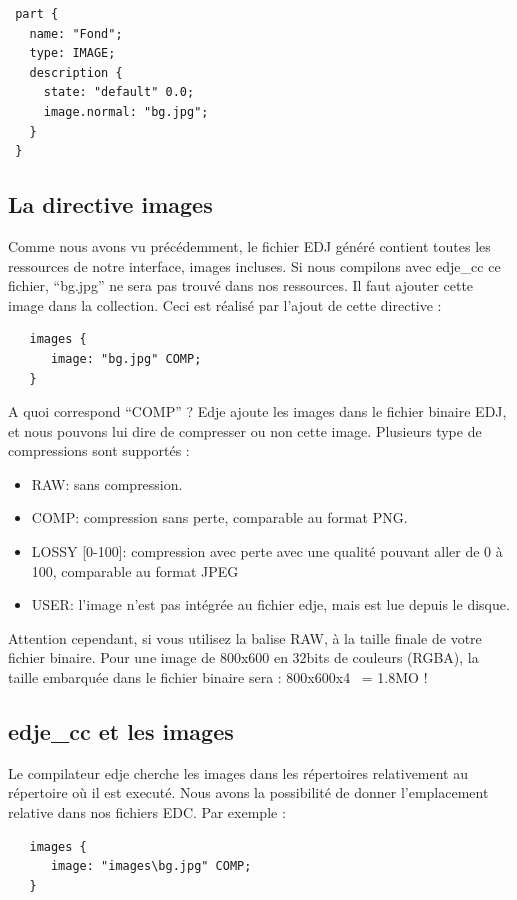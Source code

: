 \documentclass[a4paper]{efr}
\begin{document}
\begin{lstlisting}
 part {
   name: "Fond";
   type: IMAGE;
   description {
     state: "default" 0.0;
     image.normal: "bg.jpg";
   }
 }
\end{lstlisting}
\subsection{La directive images}
Comme nous avons vu précédemment, le fichier EDJ généré contient toutes les
ressources de notre interface, images incluses. Si nous compilons avec edje\_cc
ce fichier, ``bg.jpg'' ne sera pas trouvé dans nos ressources. Il faut ajouter
cette image dans la collection. Ceci est réalisé par l'ajout de cette directive
:
\begin{lstlisting}
   images {
      image: "bg.jpg" COMP;
   }
\end{lstlisting}

A quoi correspond ``COMP'' ? Edje ajoute les images dans le fichier binaire EDJ,
et nous pouvons lui dire de compresser ou non cette image.
Plusieurs type de compressions sont supportés :
\begin{itemize}
\item RAW: sans compression.
\item COMP: compression sans perte, comparable au format PNG.
\item LOSSY [0-100]: compression avec perte avec une qualité pouvant aller
de 0 à 100, comparable au format JPEG
\item USER: l'image n'est pas intégrée au fichier edje, mais est lue depuis
le disque.
\end{itemize}

Attention cependant, si vous utilisez la balise RAW, à la taille
finale de votre fichier binaire.
Pour une image de 800x600 en 32bits de couleurs (RGBA), la taille embarquée dans
le fichier binaire sera : 800x600x4 ~= 1.8MO !

\subsection{edje\_cc et les images}
Le compilateur edje cherche les images dans les répertoires relativement au
répertoire où il est executé.
Nous avons la possibilité de donner l'emplacement relative dans nos fichiers
EDC. Par exemple :

\begin{lstlisting}
   images {
      image: "images\bg.jpg" COMP;
   }
\end{lstlisting}
\end{document}
